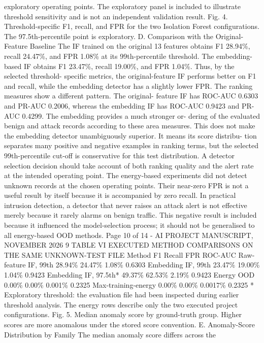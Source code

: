 \documentclass[
]{article}
\begin{document}
exploratory operating points. The exploratory panel is included to
illustrate threshold sensitivity and is not an independent validation
result. Fig. 4. Threshold-specific F1, recall, and FPR for the two
Isolation Forest configurations. The 97.5th-percentile point is
exploratory. D. Comparison with the Original-Feature Baseline The IF
trained on the original 13 features obtains F1 28.94\%, recall 24.47\%,
and FPR 1.08\% at its 99th-percentile threshold. The embedding-based IF
obtains F1 23.47\%, recall 19.00\%, and FPR 1.04\%. Thus, by the
selected threshold- specific metrics, the original-feature IF performs
better on F1 and recall, while the embedding detector has a slightly
lower FPR. The ranking measures show a different pattern. The original-
feature IF has ROC-AUC 0.6303 and PR-AUC 0.2006, whereas the embedding
IF has ROC-AUC 0.9423 and PR- AUC 0.4299. The embedding provides a much
stronger or- dering of the evaluated benign and attack records according
to these area measures. This does not make the embedding detector
unambiguously superior. It means its score distribu- tion separates many
positive and negative examples in ranking terms, but the selected
99th-percentile cut-off is conservative for this test distribution. A
detector selection decision should take account of both ranking quality
and the alert rate at the intended operating point. The energy-based
experiments did not detect unknown records at the chosen operating
points. Their near-zero FPR is not a useful result by itself because it
is accompanied by zero recall. In practical intrusion detection, a
detector that never raises an attack alert is not effective merely
because it rarely alarms on benign traffic. This negative result is
included because it influenced the model-selection process; it should
not be generalised to all energy-based OOD methods. Page 10 of 14 - AI
PROJECT MANUSCRIPT, NOVEMBER 2026 9 TABLE VI EXECUTED METHOD COMPARISONS
ON THE SAME UNKNOWN-TEST FILE Method F1 Recall FPR ROC-AUC Raw-feature
IF, 99th 28.94\% 24.47\% 1.08\% 0.6303 Embedding IF, 99th 23.47\%
19.00\% 1.04\% 0.9423 Embedding IF, 97.5th* 49.37\% 62.53\% 2.19\%
0.9423 Energy OOD 0.00\% 0.00\% 0.001\% 0.2325 Max-training-energy
0.00\% 0.00\% 0.0017\% 0.2325 * Exploratory threshold: the evaluation
file had been inspected during earlier threshold analysis. The energy
rows describe only the two executed project configurations. Fig. 5.
Median anomaly score by ground-truth group. Higher scores are more
anomalous under the stored score convention. E. Anomaly-Score
Distribution by Family The median anomaly score differs across the
\end{document}
